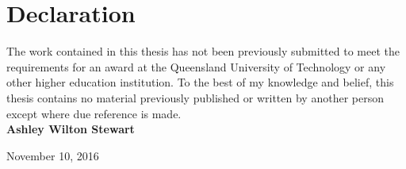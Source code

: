 \documentclass[../main.tex]{subfiles}
\begin{document}
\section*{Declaration}
The work contained in this thesis has not been previously submitted to meet the requirements for an award at the Queensland University of Technology or any other higher education institution. To the best of my knowledge and belief, this thesis contains no material previously published or written by another person except where due reference is made.
\newline
\newline
\newline
\textbf{\\Ashley Wilton Stewart}

November 10, 2016

\newpage
\end{document}
